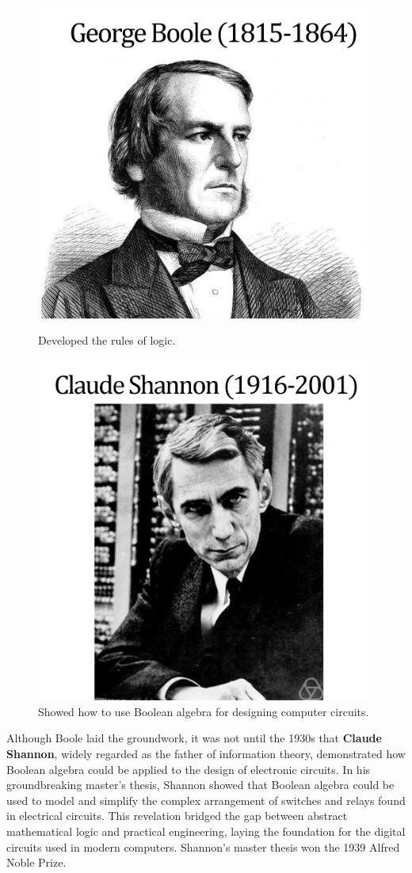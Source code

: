 \begin{figure}[htbp]
    \centering
    \begin{multicols}{2}  %

        \begin{center}
            \includegraphics[width=0.6\linewidth]{figure/boole.png}  %
            \caption{Developed the rules of logic.}
        \end{center}

        \begin{center}
            \includegraphics[width=0.6\linewidth]{figure/shannon.png}  %
            \caption{Showed how to use Boolean algebra for designing computer circuits.}
        \end{center}
    \end{multicols}
\end{figure}

Although Boole laid the groundwork, it was not until the 1930s that \textbf{Claude Shannon}, widely regarded as the father of information theory, demonstrated how Boolean algebra could be applied to the design of electronic circuits. In his groundbreaking master's thesis, Shannon showed that Boolean algebra could be used to model and simplify the complex arrangement of switches and relays found in electrical circuits. This revelation bridged the gap between abstract mathematical logic and practical engineering, laying the foundation for the digital circuits used in modern computers. Shannon's master thesis won the 1939 Alfred Noble Prize.


